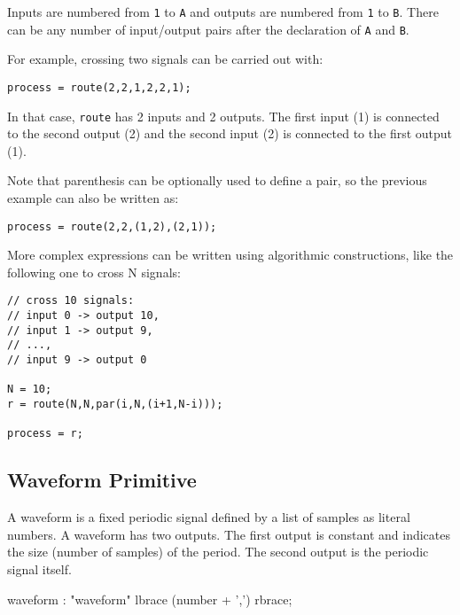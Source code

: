 Inputs are numbered from \lstinline'1' to \lstinline'A' and outputs are numbered from \lstinline'1' to \lstinline'B'. There can be any number of input/output pairs after the declaration of \lstinline'A' and \lstinline'B'.

For example, crossing two signals can be carried out with:

\begin{lstlisting}
process = route(2,2,1,2,2,1);
\end{lstlisting}

In that case, \lstinline'route' has 2 inputs and 2 outputs. The first input (1) is connected to the second output (2) and the second input (2) is connected to the first output (1).

Note that parenthesis can be optionally used to define a pair, so the previous example can also be written as:

\begin{lstlisting}
process = route(2,2,(1,2),(2,1));
\end{lstlisting}

More complex expressions can be written using algorithmic constructions, like the following one to cross N signals:

\begin{lstlisting}
// cross 10 signals: 
// input 0 -> output 10, 
// input 1 -> output 9, 
// ..., 
// input 9 -> output 0

N = 10;
r = route(N,N,par(i,N,(i+1,N-i)));

process = r;
\end{lstlisting}

\subsection{Waveform Primitive}

A waveform is a fixed periodic signal defined by a list of samples as literal numbers. A waveform has two outputs. The first output is constant and indicates the size (number of samples) of the period. The second output is the periodic signal itself.

\begin{rail}
	waveform : "waveform" lbrace (number + ',') rbrace;
\end{rail}

